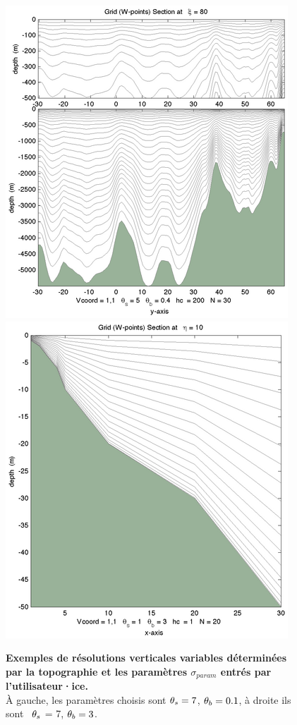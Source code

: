 \documentclass[10pt,a4paper,titlepage]{article}
\begin{document}
\begin{figure}[h!]
    \centering
    \includegraphics{../images/vcoord_ex1.png}
    \includegraphics{../images/vcoord_ex5.png}
    \caption{\textbf{Exemples de résolutions verticales variables déterminées par la topographie et les paramètres  $\sigma_{param}$ entrés par l'utilisateur·ice.} \\
        À gauche, les paramètres choisis sont  $\protect\theta_s = 7$, $\protect\theta_b = 0.1$, à droite ils sont  $\protect\theta_s$ = 7, $\protect\theta_b = 3$.}
    \label{vertical_resolution}
\end{figure}
\end{document}
